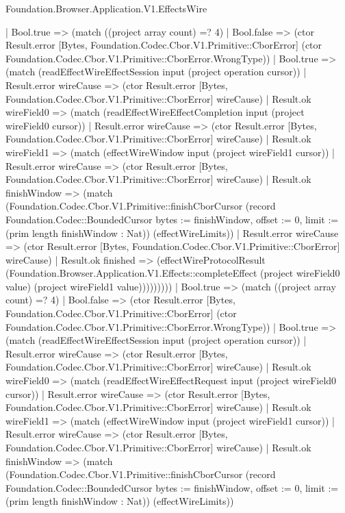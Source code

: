 \begin{lexlean}{Foundation.Browser.Application.V1.EffectsWire}
\begin{semanticmodule}
{                | Bool.true => (match ((project array count) =? 4)
                  | Bool.false => (ctor Result.error [Bytes, Foundation.Codec.Cbor.V1.Primitive::CborError] (ctor Foundation.Codec.Cbor.V1.Primitive::CborError.WrongType))
                  | Bool.true => (match (readEffectWireEffectSession input (project operation cursor))
                    | Result.error wireCause => (ctor Result.error [Bytes, Foundation.Codec.Cbor.V1.Primitive::CborError] wireCause)
                    | Result.ok wireField0 => (match (readEffectWireEffectCompletion input (project wireField0 cursor))
                      | Result.error wireCause => (ctor Result.error [Bytes, Foundation.Codec.Cbor.V1.Primitive::CborError] wireCause)
                      | Result.ok wireField1 => (match (effectWireWindow input (project wireField1 cursor))
                        | Result.error wireCause => (ctor Result.error [Bytes, Foundation.Codec.Cbor.V1.Primitive::CborError] wireCause)
                        | Result.ok finishWindow => (match (Foundation.Codec.Cbor.V1.Primitive::finishCborCursor (record Foundation.Codec::BoundedCursor {bytes := finishWindow, offset := 0, limit := (prim length finishWindow : Nat)}) (effectWireLimits))
                          | Result.error wireCause => (ctor Result.error [Bytes, Foundation.Codec.Cbor.V1.Primitive::CborError] wireCause)
                          | Result.ok finished => (effectWireProtocolResult (Foundation.Browser.Application.V1.Effects::completeEffect (project wireField0 value) (project wireField1 value)))))))))
              | Bool.true => (match ((project array count) =? 4)
                | Bool.false => (ctor Result.error [Bytes, Foundation.Codec.Cbor.V1.Primitive::CborError] (ctor Foundation.Codec.Cbor.V1.Primitive::CborError.WrongType))
                | Bool.true => (match (readEffectWireEffectSession input (project operation cursor))
                  | Result.error wireCause => (ctor Result.error [Bytes, Foundation.Codec.Cbor.V1.Primitive::CborError] wireCause)
                  | Result.ok wireField0 => (match (readEffectWireEffectRequest input (project wireField0 cursor))
                    | Result.error wireCause => (ctor Result.error [Bytes, Foundation.Codec.Cbor.V1.Primitive::CborError] wireCause)
                    | Result.ok wireField1 => (match (effectWireWindow input (project wireField1 cursor))
                      | Result.error wireCause => (ctor Result.error [Bytes, Foundation.Codec.Cbor.V1.Primitive::CborError] wireCause)
                      | Result.ok finishWindow => (match (Foundation.Codec.Cbor.V1.Primitive::finishCborCursor (record Foundation.Codec::BoundedCursor {bytes := finishWindow, offset := 0, limit := (prim length finishWindow : Nat)}) (effectWireLimits))
}
\end{semanticmodule}
\end{lexlean}
